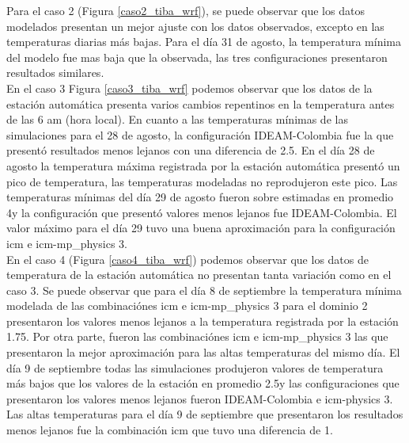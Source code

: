 Para el caso 2 (Figura \ref{caso2_tiba_wrf}), se puede observar que los datos modelados presentan un mejor ajuste con los datos observados, excepto en las temperaturas diarias más bajas. Para el día 31 de agosto, la temperatura mínima del modelo fue mas baja que la observada, las tres configuraciones presentaron resultados similares.\\


En el caso 3 Figura \ref{caso3_tiba_wrf} podemos observar que los datos de la estación automática presenta varios cambios repentinos en la temperatura antes de las 6 am (hora local). En cuanto a las temperaturas mínimas de las simulaciones para el 28 de agosto, la configuración IDEAM-Colombia fue la que presentó resultados menos lejanos con una diferencia de 2.5\celsius. En el día 28 de agosto la temperatura máxima registrada por la estación automática presentó un pico de temperatura, las temperaturas modeladas no reprodujeron este pico. Las temperaturas mínimas del día 29 de agosto fueron sobre estimadas en promedio 4\celsius y la configuración que presentó valores menos lejanos fue IDEAM-Colombia. El valor máximo para el día 29 tuvo una buena aproximación para la configuración icm e icm-mp\_physics 3.\\

En el caso 4 (Figura \ref{caso4_tiba_wrf}) podemos observar que los datos de temperatura de la estación automática no presentan tanta variación como en el caso 3. Se puede observar que para el día 8 de septiembre la temperatura mínima modelada de las combinaciónes icm e icm-mp\_physics 3 para el dominio 2 presentaron los valores menos lejanos a la temperatura registrada por la estación 1.75\celsius. Por otra parte, fueron las combinaciónes icm e icm-mp\_physics 3 las que presentaron la mejor aproximación para las altas temperaturas del mismo día. El día 9 de septiembre todas las simulaciones produjeron valores de temperatura más bajos que los valores de la estación en promedio 2.5\celsius y las configuraciones que presentaron los valores menos lejanos fueron IDEAM-Colombia e icm-physics 3. Las altas temperaturas para el día 9 de septiembre que presentaron los resultados menos lejanos fue la combinación icm que tuvo una diferencia de 1\celsius.\\

